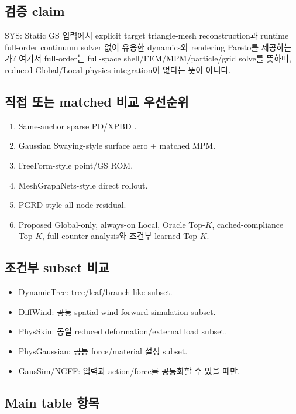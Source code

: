 \documentclass[11pt,a4paper]{article}
\begin{document}
\subsection*{검증 claim}

SYS: Static GS 입력에서 explicit target triangle-mesh reconstruction과
runtime full-order continuum solver 없이
유용한 dynamics와 rendering Pareto를 제공하는가?
여기서 full-order는 full-space shell/FEM/MPM/particle/grid solve를 뜻하며,
reduced Global/Local physics integration이 없다는 뜻이 아니다.

\subsection*{직접 또는 matched 비교 우선순위}

\begin{enumerate}[leftmargin=1.7em]
  \item Same-anchor sparse PD/XPBD \cite{bouaziz2014projective,macklin2016xpbd}.
  \item Gaussian Swaying-style surface aero + matched MPM.
  \item FreeForm-style point/GS ROM.
  \item MeshGraphNets-style direct rollout.
  \item PGRD-style all-node residual.
  \item Proposed Global-only, always-on Local, Oracle Top-\(K\),
  cached-compliance Top-\(K\), full-counter analysis와 조건부 learned Top-\(K\).
\end{enumerate}

\subsection*{조건부 subset 비교}

\begin{itemize}[leftmargin=1.5em]
  \item DynamicTree: tree/leaf/branch-like subset.
  \item DiffWind: 공통 spatial wind forward-simulation subset.
  \item PhysSkin: 동일 reduced deformation/external load subset.
  \item PhysGaussian: 공통 force/material 설정 subset.
  \item GausSim/NGFF: 입력과 action/force를 공통화할 수 있을 때만.
\end{itemize}

\subsection*{Main table 항목}
\end{document}
